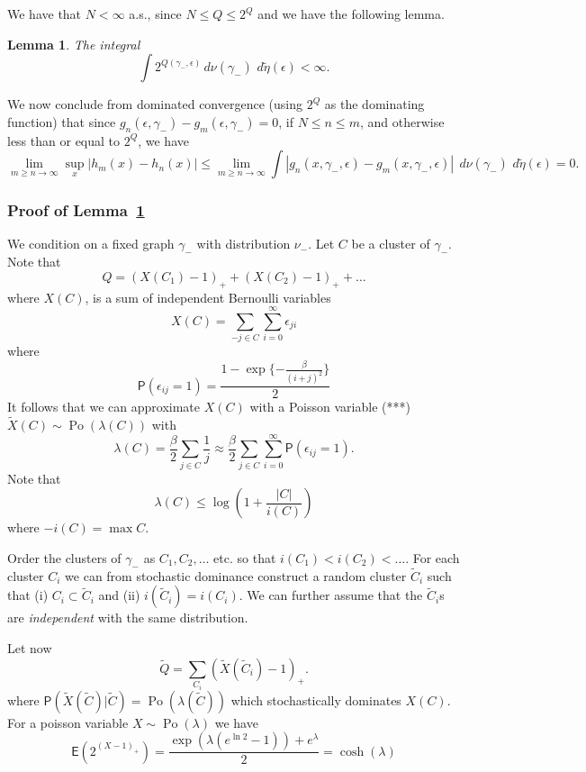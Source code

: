 \documentclass[11pt, a4paper]{amsart}
\newtheorem{lemma}[thm]{Lemma}
\theoremstyle{definition}
\theoremstyle{remark}
\renewcommand{\d}{\,d}
\providecommand{\opn}{\operatorname}
\renewcommand{\P}{\mathsf{P}}
\providecommand{\E}{\mathsf{E}}
\providecommand{\e}{\epsilon}
\providecommand{\tl}{\tilde}
\providecommand{\g}{\gamma}
\begin{document}
We have that $N<\infty$ a.s., since $N\leq Q\leq 2^Q$ and we have the following lemma.
\begin{lemma}\label{lem:qn}
  The integral
  $$
    \int 2^{Q(\gamma_-,\epsilon)} \d\nu(\g_-)\, \d\tilde\eta(\e) <\infty.
  $$
\end{lemma}
We now conclude from dominated convergence (using $2^Q$ as the dominating function) that since $g_n(\epsilon, \gamma_-)-g_m(\epsilon, \gamma_-)=0$, if $N\leq n\leq m$, and otherwise less than or equal to $2^Q$, we have 
$$ \lim_{m\geq n\to \infty}\sup_{x} |h_m(x)-h_n(x)|\leq \lim_{m\geq n\to \infty} \int |g_n(x,\gamma_-,\epsilon)-g_m(x,\gamma_-,\epsilon)   |\; \d\nu(\g_-)\, \d\tilde\eta(\e)=0.$$


\subsubsection*{Proof of Lemma~\ref{lem:qn}}

We condition on a fixed graph $\g_-$ with distribution $\nu_-$. Let $C$ be a
cluster of $\g_-$. Note that
$$ Q=(X(C_1) -1)_{+} +(X(C_2)-1)_{+} + \ldots $$
where $X(C)$, is a sum of independent Bernoulli variables
$$ X(C) = \sum_{-j\in C} \sum_{i=0}^\infty \e_{ji} $$
where
$$
\P(\e_{ij}=1) = \frac{1- \exp\{-\frac \beta{(i+j)^2}\}}{2}
$$
It follows that we can approximate $X(C)$ with a Poisson variable (***)
$\tl X(C) \sim \opn{Po}(\lambda(C))$ with
$$
\lambda(C) = \frac{\beta}{2} \sum_{j\in C} \frac 1j
\approx \frac{\beta}{2} \sum_{j\in C} \sum_{i=0}^\infty \P(\e_{ij}=1).
$$
Note that
\begin{equation}
  \label{eq:lambdabound}
    \lambda(C) \leq \log \left(1+\frac{|C|}{i(C)}\right)
\end{equation}
where $-i(C)=\max C$.

Order the clusters of $\g_-$ as $C_1,C_2,\dots$ etc. so that
$i(C_1)<i(C_2)<\dots$. For each cluster $C_i$ we can from stochastic dominance
construct a random cluster $\tl C_i$ such that (i) $C_i \subset \tl C_i$ and (ii)
$i(\tl C_i)=i(C_i)$. We can further assume that the $\tl C_i$s are
\emph{independent} with the same distribution.

Let now
\[
  \tl Q = \sum_{C_i} (\tl X(\tl C_i) - 1)_+.
\]
where $\P(\tl X(\tl C)| \tl C) = \opn{Po}(\lambda(\tl C))$ which stochastically
dominates $X(C)$. For a poisson variable $X\sim\opn{Po}(\lambda)$ we have
\[
  \E(2^{(X-1)_+}) = \frac{\exp(\lambda(e^{\ln 2}-1)) + e^{\lambda}}{2} = \cosh(\lambda)
\]
\end{document}

